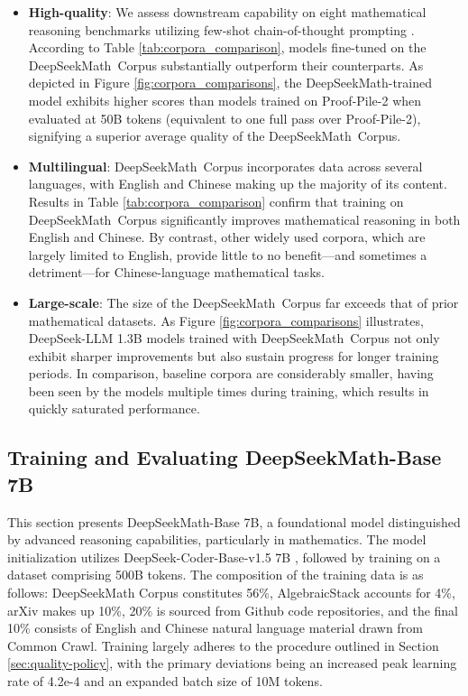 \begin{itemize}[topsep=0pt]
    \item \textbf{High-quality}:  
    We assess downstream capability on eight mathematical reasoning benchmarks utilizing few-shot chain-of-thought prompting \cite{cot}. According to Table \ref{tab:corpora_comparison}, models fine-tuned on the DeepSeekMath~Corpus substantially outperform their counterparts. As depicted in Figure \ref{fig:corpora_comparisons}, the DeepSeekMath-trained model exhibits higher scores than models trained on Proof-Pile-2 when evaluated at 50B tokens (equivalent to one full pass over Proof-Pile-2), signifying a superior average quality of the DeepSeekMath~Corpus.
    \item \textbf{Multilingual}:  
    DeepSeekMath~Corpus incorporates data across several languages, with English and Chinese making up the majority of its content. Results in Table \ref{tab:corpora_comparison} confirm that training on DeepSeekMath~Corpus significantly improves mathematical reasoning in both English and Chinese. By contrast, other widely used corpora, which are largely limited to English, provide little to no benefit—and sometimes a detriment—for Chinese-language mathematical tasks.
    \item \textbf{Large-scale}:  
    The size of the DeepSeekMath~Corpus far exceeds that of prior mathematical datasets. As Figure \ref{fig:corpora_comparisons} illustrates, DeepSeek-LLM 1.3B models trained with DeepSeekMath~Corpus not only exhibit sharper improvements but also sustain progress for longer training periods. In comparison, baseline corpora are considerably smaller, having been seen by the models multiple times during training, which results in quickly saturated performance.
\end{itemize}

\subsection{Training and Evaluating DeepSeekMath-Base 7B}

This section presents DeepSeekMath-Base 7B, a foundational model distinguished by advanced reasoning capabilities, particularly in mathematics. The model initialization utilizes DeepSeek-Coder-Base-v1.5 7B \citep{deepseek-coder}, followed by training on a dataset comprising 500B tokens. The composition of the training data is as follows: DeepSeekMath Corpus constitutes 56\%, AlgebraicStack accounts for 4\%, arXiv makes up 10\%, 20\% is sourced from Github code repositories, and the final 10\% consists of English and Chinese natural language material drawn from Common Crawl. Training largely adheres to the procedure outlined in Section \ref{sec:quality-policy}, with the primary deviations being an increased peak learning rate of 4.2e-4 and an expanded batch size of 10M tokens.

